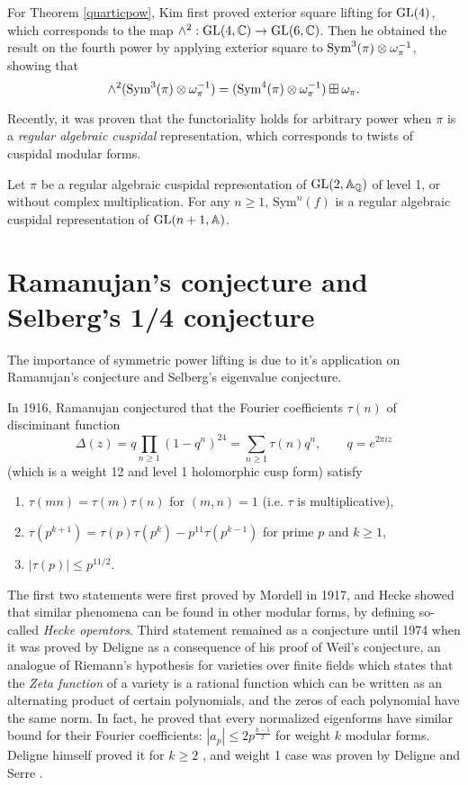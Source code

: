 For Theorem \ref{quarticpow}, Kim first proved exterior square lifting for $\operatorname{\mathrm{GL}}(4)$, which corresponds to the map $\wedge^{2}:\operatorname{\mathrm{GL}}(4, \mathbb{C}) \to \operatorname{\mathrm{GL}}(6, \mathbb{C})$.
Then he obtained the result on the fourth power by applying exterior square to $\mathrm{Sym}^{3}(\pi) \otimes \omega_{\pi}^{-1}$, showing that 
$$
\wedge^{2}(\mathrm{Sym}^{3}(\pi) \otimes \omega_{\pi}^{-1}) = (\mathrm{Sym}^{4}(\pi) \otimes \omega_{\pi}^{-1}) \boxplus \omega_{\pi}.
$$

Recently, it was proven that the functoriality holds for arbitrary power when $\pi$ is a \emph{regular algebraic cuspidal} representation,
which corresponds to twists of cuspidal modular forms.
\begin{theorem}
Let $\pi$ be a regular algebraic cuspidal representation of $\operatorname{\mathrm{GL}}(2, \mathbb{A}_{\mathbb{Q}})$ of level 1, or without complex multiplication.
For any $n\geq 1$, $\mathrm{Sym}^{n}(f)$ is a regular algebraic cuspidal representation of $\operatorname{\mathrm{GL}}(n + 1, \mathbb{A})$.
\end{theorem}


\section{Ramanujan's conjecture and Selberg's 1/4 conjecture}

The importance of symmetric power lifting is due to it's application on Ramanujan's conjecture and Selberg's eigenvalue conjecture.

In 1916, Ramanujan conjectured that the Fourier coefficients $\tau(n)$ of disciminant function
$$
\Delta(z) = q\prod_{n\geq 1}(1 - q^{n})^{24} = \sum_{n\geq 1}\tau(n)q^{n}, \qquad q = e^{2\pi i z}
$$
(which is a weight 12 and level 1 holomorphic cusp form) satisfy
\begin{enumerate}
    \item $\tau(mn) = \tau(m)\tau(n)$ for $(m, n) =1$ (i.e. $\tau$ is multiplicative),
    \item $\tau(p^{k+1}) = \tau(p)\tau(p^{k}) - p^{11}\tau(p^{k-1})$ for prime $p$ and $k\geq 1$,
    \item $|\tau(p)|\leq p^{11/2}$.
\end{enumerate}
The first two statements were first proved by Mordell in 1917, and Hecke showed that 
similar phenomena can be found in other modular forms, by defining so-called \emph{Hecke operators}.
Third statement remained as a conjecture until 1974 when it was proved by Deligne
as a consequence of his proof of Weil's conjecture, an analogue of Riemann's hypothesis for varieties over finite fields
which states that the \emph{Zeta function} of a variety is a rational function which can be written as
an alternating product of certain polynomials, and the zeros of each polynomial have the same norm.
In fact, he proved that every normalized eigenforms have similar bound for their Fourier coefficients: 
$|a_{p}| \leq 2p^{\frac{k-1}{2}}$ for weight $k$ modular forms.
Deligne himself proved it for $k\geq 2$ \cite{deligne1971formes},
and weight 1 case was proven by Deligne and Serre \cite{deligne1974formes}.



